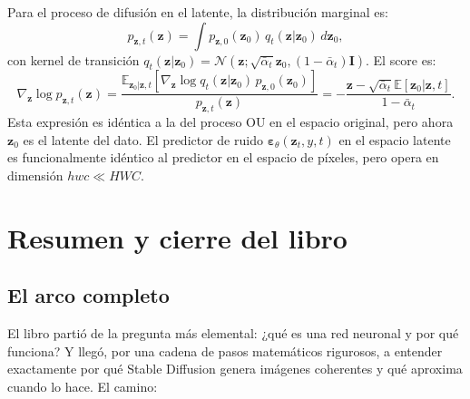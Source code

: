 Para el proceso de difusión en el latente, la distribución marginal es:
\[
  p_{\bm{z},t}(\bm{z})
  = \int p_{\bm{z},0}(\bm{z}_0)\,q_t(\bm{z}|\bm{z}_0)\,d\bm{z}_0,
\]
con kernel de transición $q_t(\bm{z}|\bm{z}_0) = \mathcal{N}(\bm{z};
\sqrt{\bar{\alpha}_t}\bm{z}_0, (1-\bar{\alpha}_t)\bm{I})$.
El score es:
\[
  \nabla_{\bm{z}}\log p_{\bm{z},t}(\bm{z})
  = \frac{\mathbb{E}_{\bm{z}_0|{\bm{z},t}}\!\left[
    \nabla_{\bm{z}}\log q_t(\bm{z}|\bm{z}_0)\,p_{\bm{z},0}(\bm{z}_0)\right]}
    {p_{\bm{z},t}(\bm{z})}
  = -\frac{\bm{z} - \sqrt{\bar{\alpha}_t}\mathbb{E}[\bm{z}_0|\bm{z},t]}
    {1-\bar{\alpha}_t}.
\]
Esta expresión es idéntica a la del proceso OU en el espacio original, pero
ahora $\bm{z}_0$ es el latente del dato. El predictor de ruido $\bm{\varepsilon}_\theta
(\bm{z}_t, y, t)$ en el espacio latente es funcionalmente idéntico al predictor
en el espacio de píxeles, pero opera en dimensión $hwc \ll HWC$.

\section{Resumen y cierre del libro}
\label{sec:resumen12}

\subsection{El arco completo}
\label{subsec:arco_completo}

El libro partió de la pregunta más elemental: ¿qué es una red neuronal y por
qué funciona? Y llegó, por una cadena de pasos matemáticos rigurosos, a entender
exactamente por qué Stable Diffusion genera imágenes coherentes y qué aproxima
cuando lo hace. El camino:

